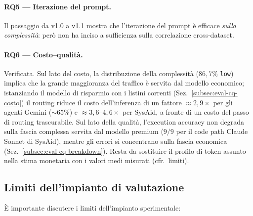 \paragraph{RQ5 --- Iterazione del prompt.} Il passaggio da v1.0 a v1.1 mostra che l'iterazione del prompt è efficace \emph{sulla complessità}:
però non ha inciso a sufficienza sulla correlazione cross-dataset.

\paragraph{RQ6 --- Costo--qualità.} Verificata. Sul lato del costo, la
distribuzione della complessità ($86{,}7\%$ \texttt{low}) implica che la
grande maggioranza del traffico è servita dal modello economico;
istanziando il modello di risparmio con i listini correnti
(Sez.~\ref{subsec:eval-cq-costo}) il routing riduce il costo dell'inferenza
di un fattore $\approx 2{,}9\times$ per gli agenti Gemini ($\sim 65\%$) e
$\approx 3{,}6$--$4{,}6\times$ per SysAid, a fronte di un costo del passo di
routing trascurabile. Sul lato della qualità, l'execution accuracy non
degrada sulla fascia complessa servita dal modello premium ($9/9$ per il
code path Claude Sonnet di SysAid), mentre gli errori si concentrano sulla
fascia economica (Sez.~\ref{subsec:eval-cq-breakdown}). Resta da sostituire
il profilo di token assunto nella stima monetaria con i valori medi
misurati (cfr.\ limiti).

\subsection{Limiti dell'impianto di valutazione}
\label{subsec:eval-limiti}

È importante discutere i limiti dell'impianto sperimentale:

